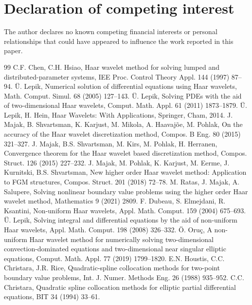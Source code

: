 \documentclass[preprint,12pt]{elsarticle}
\theoremstyle{remark}
\begin{document}
\section*{Declaration of competing interest}
The author declares no known competing financial interests or personal relationships that could have
appeared to influence the work reported in this paper.

\begin{thebibliography}{99}
 C.F. Chen, C.H. Hsiao, Haar wavelet method for solving lumped and distributed-parameter systems, IEE Proc. Control Theory Appl. 144 (1997) 87--94.
 \"U. Lepik, Numerical solution of differential equations using Haar wavelets, Math. Comput. Simul. 68 (2005) 127--143.
 \"U. Lepik, Solving PDEs with the aid of two-dimensional Haar wavelets, Comput. Math. Appl. 61 (2011) 1873--1879.
 \"U. Lepik, H. Hein, Haar Wavelets: With Applications, Springer, Cham, 2014.
 J. Majak, B. Shvartsman, K. Karjust, M. Mikola, A. Haavaj\~oe, M. Pohlak, On the accuracy of the Haar wavelet discretization method, Compos. B Eng. 80 (2015) 321--327.
 J. Majak, B.S. Shvartsman, M. Kirs, M. Pohlak, H. Herranen, Convergence theorem for the Haar wavelet based discretization method, Compos. Struct. 126 (2015) 227--232.
 J. Majak, M. Pohlak, K. Karjust, M. Eerme, J. Kurnitski, B.S. Shvartsman, New higher order Haar wavelet method: Application to FGM structures, Compos. Struct. 201 (2018) 72--78.
 M. Ratas, J. Majak, A. Salupere, Solving nonlinear boundary value problems using the higher order Haar wavelet method, Mathematics 9 (2021) 2809.
 F. Dubeau, S. Elmejdani, R. Ksantini, Non-uniform Haar wavelets, Appl. Math. Comput. 159 (2004) 675--693.
 \"U. Lepik, Solving integral and differential equations by the aid of non-uniform Haar wavelets, Appl. Math. Comput. 198 (2008) 326--332.
 \"O. Oru\c{c}, A non-uniform Haar wavelet method for numerically solving two-dimensional convection-dominated equations and two-dimensional near singular elliptic equations, Comput. Math. Appl. 77 (2019) 1799--1820.
 E.N. Houstis, C.C. Christara, J.R. Rice, Quadratic-spline collocation methods for two-point boundary value problems, Int. J. Numer. Methods Eng. 26 (1988) 935--952.
 C.C. Christara, Quadratic spline collocation methods for elliptic partial differential equations, BIT 34 (1994) 33--61.

\end{thebibliography}
\end{document}
